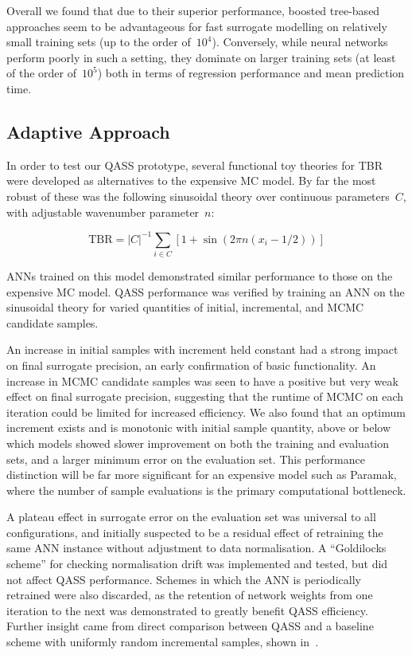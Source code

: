 Overall we found that due to their superior performance, boosted tree-based
approaches seem to be advantageous for fast surrogate modelling on relatively small training
sets (up to the order of~$10^4$). Conversely, while neural networks perform
poorly in such a setting, they dominate on larger training sets (at least of the
order of~$10^5$) both in terms of regression performance and mean prediction time.

\subsection{Adaptive Approach}\label{sec:adaptiveres}


In order to test our QASS prototype, several functional toy theories for TBR
were developed as alternatives to the expensive MC model. By far the most robust
of these was the following sinusoidal theory over continuous parameters~$C$,
with adjustable wavenumber parameter~$n$:

\begin{equation}
	\text{TBR} = |C|^{-1}\sum_{i \in C} \left[1 + \sin(2\pi n (x_i - 1/2)) \right]
\end{equation}

ANNs trained on this model demonstrated similar performance to those on the expensive
MC model. QASS performance was verified by training an ANN on
the sinusoidal theory for varied quantities of initial, incremental, and MCMC
candidate samples.

An increase in initial samples with increment held constant had a strong impact
on final surrogate precision, an early confirmation of basic functionality. An
increase in MCMC candidate samples was seen to have a positive but very weak
effect on final surrogate precision, suggesting that the runtime of MCMC on each
iteration could be limited for increased efficiency. We also found that an optimum increment exists and is monotonic with initial sample quantity, above or below which models showed slower improvement on both the training and evaluation sets, and a larger minimum error on the
evaluation set. This performance distinction will be far more
significant for an expensive model such as Paramak, where the number of sample
evaluations is the primary computational bottleneck.

A plateau effect in surrogate error on the evaluation set was universal to all configurations, and initially suspected to be a residual
effect of retraining the same ANN instance without adjustment to data
normalisation. A ``Goldilocks scheme'' for checking normalisation drift was
implemented and tested, but did not affect QASS performance. Schemes in which
the ANN is periodically retrained were also discarded, as the retention of
network weights from one iteration to the next was demonstrated to greatly
benefit QASS efficiency. Further insight came from direct comparison between
QASS and a baseline scheme with uniformly random incremental samples, shown
in~.

